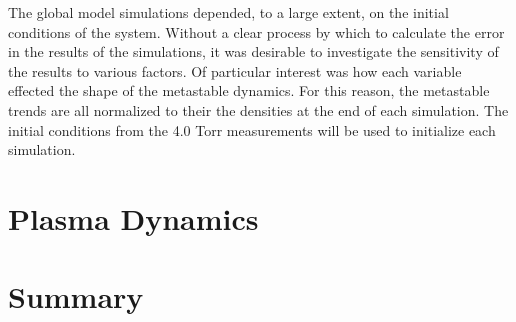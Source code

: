 The global model simulations depended, to a large extent, on the initial
conditions of the system. Without a clear process by which to calculate the
error in the results of the simulations, it was desirable to investigate the
sensitivity of the results to various factors. Of particular interest was how
each variable effected the shape of the metastable dynamics. For this reason,
the metastable trends are all normalized to their the densities at the end of
each simulation. The initial conditions from the 4.0 Torr measurements will be
used to initialize each simulation.


\section{Plasma Dynamics}



\section{Summary}


